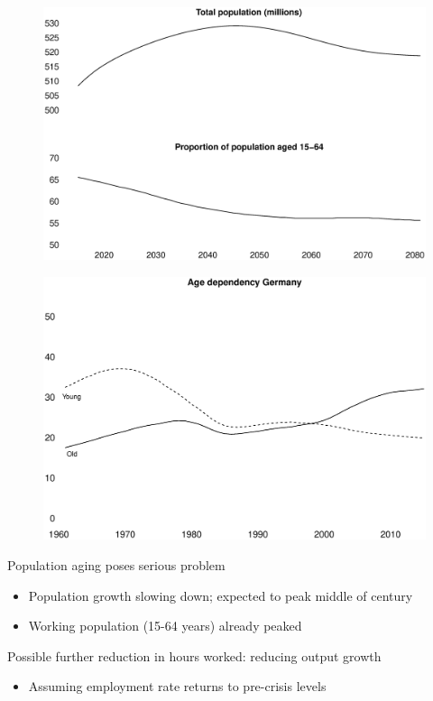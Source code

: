 \documentclass{beamer}
\begin{document}
\begin{frame}
  \begin{figure}
    \includegraphics[scale=.3]{population.eps}
  \end{figure}
\end{frame}

\begin{frame}
  \begin{figure}
    \includegraphics[scale=.3]{german_age_dependency.eps}
  \end{figure}
\end{frame}

\begin{frame}
  Population aging poses serious problem
  \medskip
  \begin{itemize}
    \item Population growth slowing down; expected to peak middle of century
    \item Working population (15-64 years) already peaked
  \end{itemize}
  \medskip
  Possible further reduction in hours worked: reducing output growth
  \begin{itemize}
    \item Assuming employment rate returns to pre-crisis levels
  \end{itemize}
\end{frame}
\end{document}
